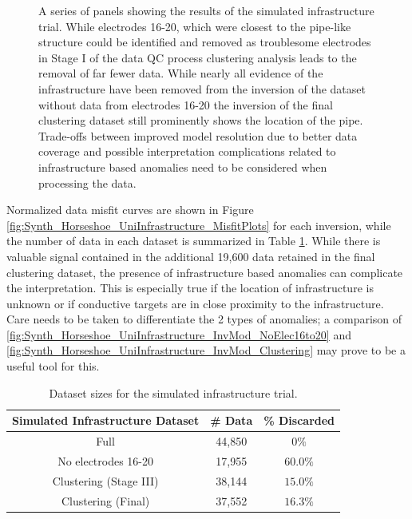 \documentclass[final,authoryear,5p,times,twocolumn]{elsarticle}
\begin{document}
\begin{figure} [!ht]
\begin{center}
{       } %
    \end{center}
\caption{A series of panels showing the results of the simulated infrastructure trial. While electrodes 16-20, which were closest to the pipe-like structure could be identified and removed as troublesome electrodes in Stage I of the data QC process clustering analysis leads to the removal of far fewer data. While nearly all evidence of the infrastructure have been removed from the inversion of the dataset without data from electrodes 16-20 the inversion of the final clustering dataset still prominently shows the location of the pipe. Trade-offs between improved model resolution due to better data coverage and possible interpretation complications related to infrastructure based anomalies need to be considered when processing the data.}
\label{fig:Synth_Horseshoe_UniInfrastructure}
\end{figure}

Normalized data misfit curves are shown in Figure \ref{fig:Synth_Horseshoe_UniInfrastructure_MisfitPlots} for each inversion, while the number of data in each dataset is summarized in Table \ref{tab:Synth_Infrastructure_Sizes}. While there is valuable signal contained in the additional 19,600 data retained in the final clustering dataset, the presence of infrastructure based anomalies can complicate the interpretation. This is especially true if the location of infrastructure is unknown or if conductive targets are in close proximity to the infrastructure. Care needs to be taken to differentiate the 2 types of anomalies; a comparison of \ref{fig:Synth_Horseshoe_UniInfrastructure_InvMod_NoElec16to20} and \ref{fig:Synth_Horseshoe_UniInfrastructure_InvMod_Clustering} may prove to be a useful tool for this.  

\begin{table}[!ht]
\small
\begin{center}
  \begin{tabular}{| c | c | c |}
    \hline
    \bf{Simulated Infrastructure Dataset} & \bf{\# Data} & \bf{\% Discarded} \\
    \hline
    Full &  44,850 & $0 \%$ \\
    \hline
    No electrodes 16-20 & 17,955 & $60.0 \%$ \\
    \hline
    Clustering (Stage III) & 38,144 & $15.0 \%$ \\
    \hline
    Clustering (Final) & 37,552 & $16.3 \%$ \\
    \hline   
  \end{tabular}
\caption{Dataset sizes for the simulated infrastructure trial.}
\label{tab:Synth_Infrastructure_Sizes}
\end{center}
\end{table} 
\end{document}

